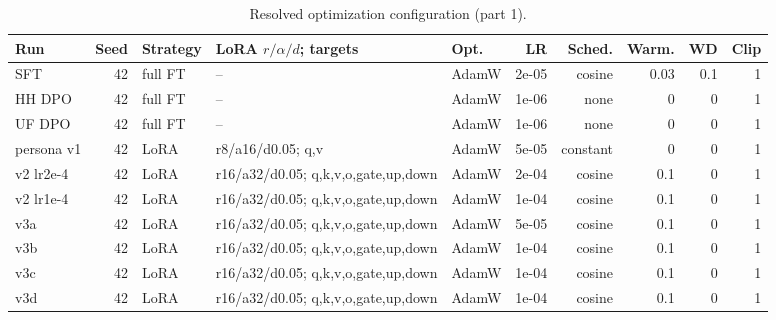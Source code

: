 \begin{table}[H]\centering\footnotesize\caption{Resolved optimization configuration (part 1).}\label{tab:config-a}
\setlength{\tabcolsep}{2.5pt}\begin{tabularx}{\textwidth}{lrl>{\raggedright\arraybackslash}Xlrrrrr}\toprule Run&Seed&Strategy&LoRA $r/\alpha/d$; targets&Opt.&LR&Sched.&Warm.&WD&Clip\\\midrule
SFT & 42 & full FT & -- & AdamW & 2e-05 & cosine & 0.03 & 0.1 & 1\\
HH DPO & 42 & full FT & -- & AdamW & 1e-06 & none & 0 & 0 & 1\\
UF DPO & 42 & full FT & -- & AdamW & 1e-06 & none & 0 & 0 & 1\\
persona v1 & 42 & LoRA & r8/a16/d0.05; q,v & AdamW & 5e-05 & constant & 0 & 0 & 1\\
v2 lr2e-4 & 42 & LoRA & r16/a32/d0.05; q,k,v,o,gate,up,down & AdamW & 2e-04 & cosine & 0.1 & 0 & 1\\
v2 lr1e-4 & 42 & LoRA & r16/a32/d0.05; q,k,v,o,gate,up,down & AdamW & 1e-04 & cosine & 0.1 & 0 & 1\\
v3a & 42 & LoRA & r16/a32/d0.05; q,k,v,o,gate,up,down & AdamW & 5e-05 & cosine & 0.1 & 0 & 1\\
v3b & 42 & LoRA & r16/a32/d0.05; q,k,v,o,gate,up,down & AdamW & 1e-04 & cosine & 0.1 & 0 & 1\\
v3c & 42 & LoRA & r16/a32/d0.05; q,k,v,o,gate,up,down & AdamW & 1e-04 & cosine & 0.1 & 0 & 1\\
v3d & 42 & LoRA & r16/a32/d0.05; q,k,v,o,gate,up,down & AdamW & 1e-04 & cosine & 0.1 & 0 & 1\\
\bottomrule\end{tabularx}\end{table}
